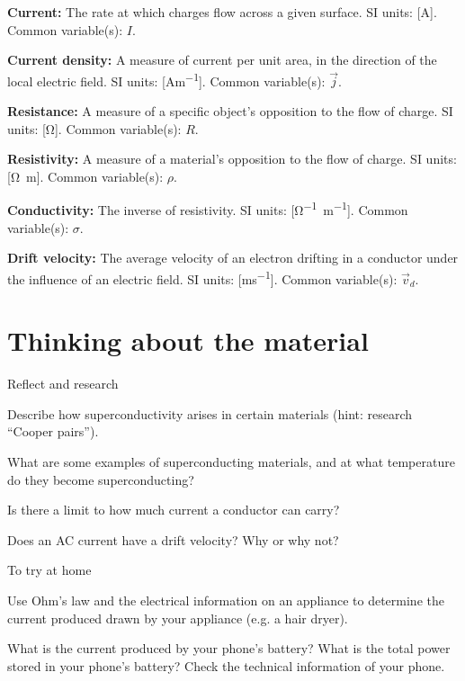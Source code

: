 \newpage
\begin{definitions}
	\item \textbf{Current:} The rate at which charges flow across a given surface. SI units: [\si{A}]. Common variable(s): $I$.
	\item \textbf{Current density:} A measure of current per unit area, in the direction of the local electric field. SI units: [\si{Am^{-1}}]. Common variable(s): $\vec j$.
	\item \textbf{Resistance:} A measure of a specific object's opposition to the flow of charge. SI units: [\si{\ohm}]. Common variable(s): $R$.
	\item \textbf{Resistivity:} A measure of a material's opposition to the flow of charge. SI units: [\si{\ohm m}]. Common variable(s): $\rho$.
	\item \textbf{Conductivity:} The inverse of resistivity. SI units: [\si{\ohm^{-1} m^{-1}}]. Common variable(s): $\sigma$.
	\item \textbf{Drift velocity:} The average velocity of an electron drifting in a conductor under the influence of an electric field. SI units: [\si{ms^{-1}}]. Common variable(s): $\vec v_{d}$.
\end{definitions}

\newpage
\section{Thinking about the material}

\begin{chapteractivity}{Reflect and research}
{
\item Describe how superconductivity arises in certain materials (hint: research ``Cooper pairs'').
\item What are some examples of superconducting materials, and at what temperature do they become superconducting?
\item Is there a limit to how much current a conductor can carry?
\item Does an AC current have a drift velocity? Why or why not?
}
\end{chapteractivity}

\begin{chapteractivity}{To try at home}
{

\item Use Ohm's law and the electrical information on an appliance to determine the current produced drawn by your appliance (e.g. a hair dryer).
\item What is the current produced by your phone's battery? What is the total power stored in your phone's battery? Check the technical information of your phone.
}
\end{chapteractivity}

